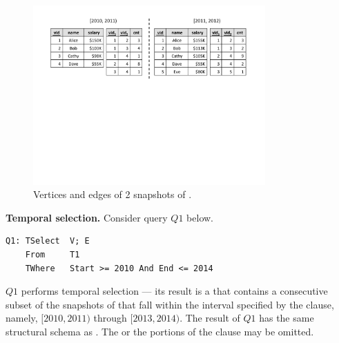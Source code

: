 \begin{figure}
\includegraphics[width=3.5in]{figs/2VE.pdf}
\caption{Vertices and edges of 2 snapshots of .}
\label{fig:2ve}
\end{figure}


{\bf Temporal selection.}  Consider query $Q1$ below.  

\begin{small}
\begin{verbatim}
Q1: TSelect  V; E
    From     T1
    TWhere   Start >= 2010 And End <= 2014
\end{verbatim}
\end{small}

$Q1$ performs temporal selection --- its result is a \tg that contains
a consecutive subset of the snapshots of  that fall within
the interval specified by the  clause, namely, $[2010,
  2011)$ through $[2013, 2014)$.  The result of $Q1$ has the same
    structural schema as . The  or the
     portions of the  clause may be omitted.

